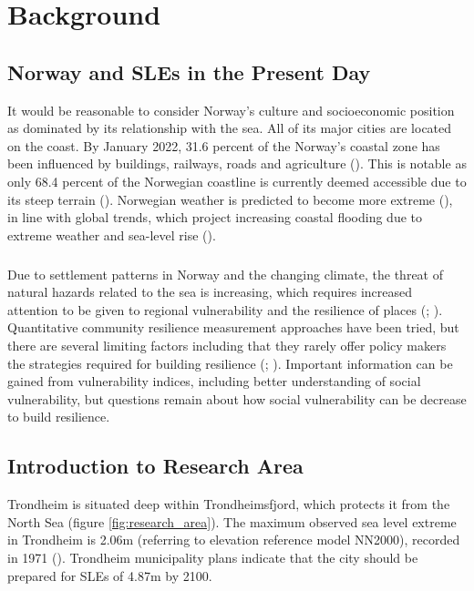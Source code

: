 \chapter{Background}

\section{Norway and SLEs in the Present Day}
 It would be reasonable to consider Norway's culture and socioeconomic position as dominated by its relationship with the sea. All of its major cities are located on the coast.  By January 2022, 31.6 percent of the Norway's coastal zone has been influenced by buildings, railways, roads and agriculture (\cite{engebakken_construction_2022}). This is notable as only 68.4 percent of the Norwegian coastline is currently deemed accessible due to its steep terrain (\cite{engebakken_construction_2022}). Norwegian weather is predicted to become more extreme (\cite{rod_integrated_2012}), in line with global trends, which project increasing coastal flooding due to extreme weather and sea-level rise (\cite{hoffken_effects_2020}). 
\paragraph{}

Due to settlement patterns in Norway and the changing climate, the threat of natural hazards related to the sea is increasing, which requires increased attention to be given to regional vulnerability and the resilience of places (\cite{opach_seeking_2020}; \cite{rod_three_2015}). Quantitative community resilience measurement approaches have been tried, but there are several limiting factors including that they rarely offer policy makers the strategies required for building resilience (\cite{opach_seeking_2020}; \cite{gerkensmeier_governing_2018}). Important information can be gained from vulnerability indices, including better understanding of social vulnerability, but questions remain about how social vulnerability can be decrease to build resilience. 


\section{Introduction to Research Area}

Trondheim is situated deep within Trondheimsfjord, which protects it from the North Sea (figure \ref{fig:research_area}). The maximum observed sea level extreme in Trondheim is 2.06m (referring to elevation reference model NN2000), recorded in 1971 (\cite{tides_high_2022}). Trondheim municipality plans indicate that the city should be prepared for SLEs of 4.87m by 2100. 
